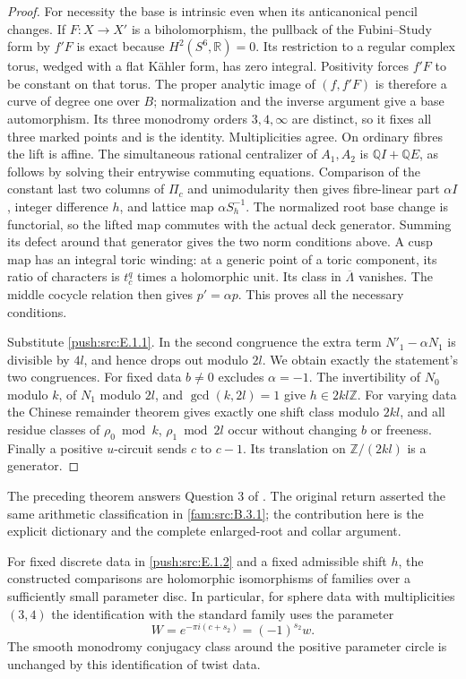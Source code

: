 \begin{proof}
For necessity the base is intrinsic even when its anticanonical
pencil changes.  If $F:X\to X'$ is a biholomorphism, the pullback
of the Fubini--Study form by $f'F$ is exact because
$H^2(S^6,\mathbb R)=0$.  Its restriction to a regular complex torus,
wedged with a flat K\"ahler form, has zero integral.  Positivity
forces $f'F$ to be constant on that torus.  The proper analytic
image of $(f,f'F)$ is therefore a curve of degree one over $B$;
normalization and the inverse argument give a base automorphism.
Its three monodromy orders $3,4,\infty$ are distinct, so it fixes
all three marked points and is the identity.  Multiplicities agree.
On ordinary fibres the lift is affine.  The simultaneous rational
centralizer of $A_1,A_2$ is $\mathbb Q I+\mathbb Q E$, as follows
by solving their entrywise commuting equations.  Comparison of the
constant last two columns of $\Pi_c$ and unimodularity then gives
fibre-linear part $\alpha I$, integer difference $h$, and lattice
map $\alpha S_h^{-1}$.  The normalized root base change is
functorial, so the lifted map commutes with the actual deck
generator.  Summing its defect around that generator gives the
two norm conditions above.  A cusp map has an integral toric
winding: at a generic point of a toric component, its ratio of
characters is $t_c^q$ times a holomorphic unit.  Its class in
$\overline\Lambda$ vanishes.  The middle cocycle relation then
gives $p'=\alpha p$.  This proves all the necessary conditions.

Substitute \ref{push:src:E.1.1}.  In the second congruence the extra term
$N'_1-\alpha N_1$ is divisible by $4l$, and hence drops out
modulo $2l$.  We obtain exactly the statement's two congruences.
For fixed data $b\ne0$ excludes $\alpha=-1$.
The invertibility of $N_0$ modulo $k$, of $N_1$ modulo $2l$, and
$\gcd(k,2l)=1$ give $h\in2kl\mathbb Z$.
For varying data the Chinese remainder theorem gives exactly one
shift class modulo $2kl$, and all residue classes of
$\rho_0\bmod k$, $\rho_1\bmod2l$ occur without changing $b$ or
freeness.  Finally a positive $u$-circuit sends $c$ to $c-1$.
Its translation on $\mathbb Z/(2kl)$ is a generator.
\end{proof}

The preceding theorem answers Question 3 of
\cite[Section 1.1]{ViaclovskyLog2026}.  The original return asserted the
same arithmetic classification in \cref{fam:src:B.3.1}; the contribution here is
the explicit dictionary and the complete enlarged-root and collar
argument.

\begin{corollary}\label{push:src:E.1.3}
For fixed discrete data in \ref{push:src:E.1.2} and a fixed admissible shift $h$,
the constructed comparisons are holomorphic isomorphisms of families
over a sufficiently small parameter disc.  In particular, for sphere
data with multiplicities $(3,4)$ the identification with the standard
family uses the parameter
\[
 W=e^{-\pi i(c+s_2)}=(-1)^{s_2}w.
\]
The smooth monodromy conjugacy class around the positive parameter
circle is unchanged by this identification of twist data.
\end{corollary}

